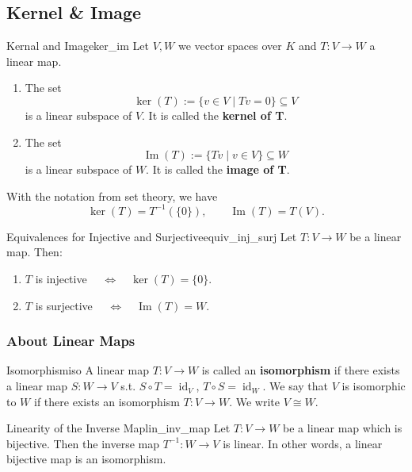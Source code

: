 \subsection{Kernel \& Image}

\begin{definition}{Kernal and Image}{ker_im}
	Let $V, W$ we vector spaces over $K$ and $T: V \to W$ a linear map.
	\begin{enumerate}
		\item The set 
		\[
		\ker(T) := \{v \in V \;|\; Tv = 0\} \subseteq V
		\]
		is a linear subspace of $V$. It is called the \textbf{kernel of T}.
		\item  The set
		\[
		\operatorname{Im}(T) := \{Tv \;|\; v \in V\} \subseteq W
		\]
		is a linear subspace of $W$. It is called the \textbf{image of T}.
	\end{enumerate}
	With the notation from set theory, we have
	\[
	\ker(T) = T^{-1}(\{0\}), \qquad \operatorname{Im}(T) = T(V).
	\]
\end{definition}

\begin{proposition}{Equivalences for Injective and Surjective}{equiv_inj_surj}
	Let $T:V \to W$ be a linear map. Then:
	\begin{enumerate}
		\item $T$ is injective $\quad \Longleftrightarrow \quad \ker(T) = \{0\}$.
		\item $T$ is surjective $\quad \Longleftrightarrow \quad \operatorname{Im}(T) = W$.
	\end{enumerate}
\end{proposition}

\subsubsection{About Linear Maps}

\begin{definition}{Isomorphism}{iso}
	A linear map $T: V \to W$ is called an \textbf{isomorphism} if there exists a linear map $S:W \to V$ s.t. $S \circ T = \operatorname{id}_{V}$, $T \circ S = \operatorname{id}_{W}$. We say that $V$ is isomorphic to $W$ if there exists an isomorphism $T: V \to W$. We write $V \cong W$.
\end{definition}

\begin{lemma}{Linearity of the Inverse Map}{lin_inv_map}
	Let $T:V \to W$ be a linear map which is bijective. Then the inverse map $T^{-1}:W \to V$ is linear. In other words, a linear bijective map is an isomorphism.
\end{lemma}

